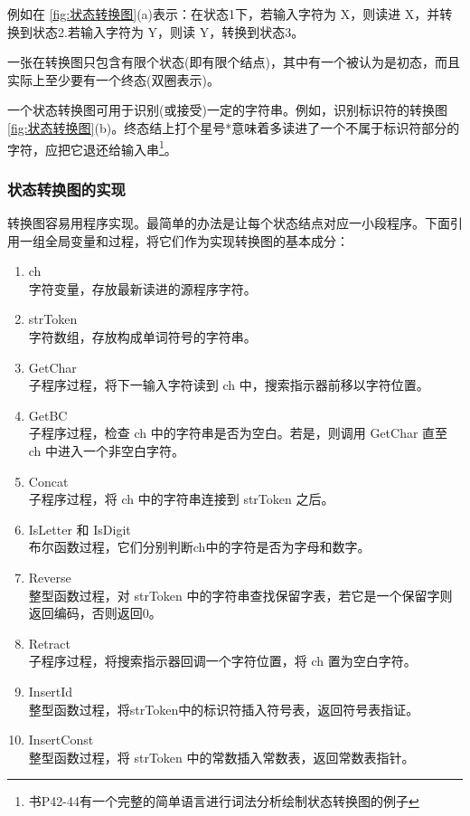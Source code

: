 例如在 \ref{fig:状态转换图}(a)表示：在状态1下，若输入字符为 X，则读进 X，并转换到状态2.若输入字符为 Y，则读 Y，转换到状态3。

一张在转换图只包含有限个状态(即有限个结点)，其中有一个被认为是初态，而且实际上至少要有一个终态(双圈表示)。

一个状态转换图可用于识别(或接受)一定的字符串。例如，识别标识符的转换图 \ref{fig:状态转换图}(b)。终态结上打个星号*意味着多读进了一个不属于标识符部分的字符，应把它退还给输入串\footnote{书P42-44有一个完整的简单语言进行词法分析绘制状态转换图的例子}。

\subsubsection{状态转换图的实现}

转换图容易用程序实现。最简单的办法是让每个状态结点对应一小段程序。下面引用一组全局变量和过程，将它们作为实现转换图的基本成分：

\begin{enumerate}
    \item ch \\
    字符变量，存放最新读进的源程序字符。
    \item strToken \\
    字符数组，存放构成单词符号的字符串。
    \item  GetChar \\
    子程序过程，将下一输入字符读到 ch 中，搜索指示器前移以字符位置。
    \item GetBC \\
    子程序过程，检查 ch 中的字符串是否为空白。若是，则调用 GetChar 直至 ch 中进入一个非空白字符。
    \item Concat \\
    子程序过程，将 ch 中的字符串连接到 strToken 之后。
    \item IsLetter 和 IsDigit \\
    布尔函数过程，它们分别判断ch中的字符是否为字母和数字。
    \item Reverse \\
    整型函数过程，对 strToken 中的字符串查找保留字表，若它是一个保留字则返回编码，否则返回0。
    \item Retract \\
    子程序过程，将搜索指示器回调一个字符位置，将 ch 置为空白字符。
    \item InsertId \\
    整型函数过程，将strToken中的标识符插入符号表，返回符号表指证。
    \item InsertConst \\
    整型函数过程，将 strToken 中的常数插入常数表，返回常数表指针。
\end{enumerate}

